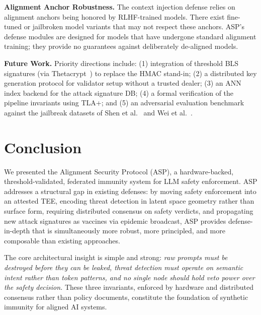 \documentclass[sigconf,natbib=false]{acmart}
\begin{document}
\textbf{Alignment Anchor Robustness.}
The context injection defense relies on alignment anchors being honored by
RLHF-trained models. There exist fine-tuned or jailbroken model variants
that may not respect these anchors. ASP's defense modules are designed for
models that have undergone standard alignment training; they provide no
guarantees against deliberately de-aligned models.

\textbf{Future Work.}
Priority directions include: (1) integration of threshold BLS signatures
(via Thetacrypt~\cite{thetacrypt2024}) to replace the HMAC stand-in;
(2) a distributed key generation protocol for validator setup without
a trusted dealer; (3) an ANN index backend for the attack signature DB;
(4) a formal verification of the pipeline invariants using TLA+; and
(5) an adversarial evaluation benchmark against the jailbreak datasets
of Shen et al.~\cite{shen2023anything} and Wei et al.~\cite{wei2023jailbroken}.

\section{Conclusion}
\label{sec:conclusion}

We presented the Alignment Security Protocol (ASP), a hardware-backed,
threshold-validated, federated immunity system for LLM safety enforcement.
ASP addresses a structural gap in existing defenses: by moving safety
enforcement into an attested TEE, encoding threat detection in latent space
geometry rather than surface form, requiring distributed consensus on safety
verdicts, and propagating new attack signatures as vaccines via epidemic
broadcast, ASP provides defense-in-depth that is simultaneously more
robust, more principled, and more composable than existing approaches.

The core architectural insight is simple and strong: \emph{raw prompts must
be destroyed before they can be leaked, threat detection must operate on
semantic intent rather than token patterns, and no single node should hold
veto power over the safety decision.} These three invariants, enforced by
hardware and distributed consensus rather than policy documents, constitute
the foundation of synthetic immunity for aligned AI systems.
\end{document}
